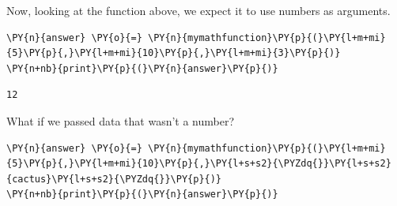     Now, looking at the function above, we expect it to use numbers as
arguments.

    \begin{tcolorbox}[breakable, size=fbox, boxrule=1pt, pad at break*=1mm,colback=cellbackground, colframe=cellborder]
\begin{Verbatim}[commandchars=\\\{\}]
\PY{n}{answer} \PY{o}{=} \PY{n}{mymathfunction}\PY{p}{(}\PY{l+m+mi}{5}\PY{p}{,}\PY{l+m+mi}{10}\PY{p}{,}\PY{l+m+mi}{3}\PY{p}{)}
\PY{n+nb}{print}\PY{p}{(}\PY{n}{answer}\PY{p}{)}
\end{Verbatim}
\end{tcolorbox}

    \begin{Verbatim}[commandchars=\\\{\}]
12
    \end{Verbatim}

    What if we passed data that wasn't a number?

    \begin{tcolorbox}[breakable, size=fbox, boxrule=1pt, pad at break*=1mm,colback=cellbackground, colframe=cellborder]
\begin{Verbatim}[commandchars=\\\{\}]
\PY{n}{answer} \PY{o}{=} \PY{n}{mymathfunction}\PY{p}{(}\PY{l+m+mi}{5}\PY{p}{,}\PY{l+m+mi}{10}\PY{p}{,}\PY{l+s+s2}{\PYZdq{}}\PY{l+s+s2}{cactus}\PY{l+s+s2}{\PYZdq{}}\PY{p}{)}
\PY{n+nb}{print}\PY{p}{(}\PY{n}{answer}\PY{p}{)}
\end{Verbatim}
\end{tcolorbox}

